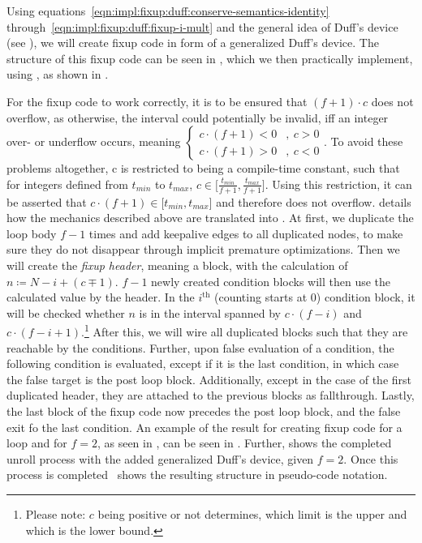 Using equations~\ref{eqn:impl:fixup:duff:conserve-semantics-identity} through~\ref{eqn:impl:fixup:duff:fixup-i-mult} and the general idea of Duff's device (see ), we will create fixup code in form of a generalized Duff's device.
The structure of this fixup code can be seen in , which we then practically implement, using , as shown in .





For the fixup code to work correctly, it is to be ensured that $(f + 1) \cdot c$ does not overflow, as otherwise, the interval \cinterval could potentially be invalid, iff an integer over- or underflow occurs, meaning $
\begin{cases}
    c \cdot (f + 1) < 0 &, \medspace c > 0\\
    c \cdot (f + 1) > 0 &, \medspace c < 0
\end{cases}$.
To avoid these problems altogether, c is restricted to being a compile-time constant, such that for integers defined from $t_{min}$ to $t_{max}$, $c \in \lbrack \frac{t_{min}}{f + 1}, \frac{t_{max}}{f + 1} \rbrack$.
Using this restriction, it can be asserted that $c \cdot (f + 1) \in \lbrack t_{min}, t_{max} \rbrack$ and therefore does not overflow.
 details how the mechanics described above are translated into \libFIRM.
At first, we duplicate the loop body $f - 1$ times and add keepalive edges to all duplicated nodes, to make sure they do not disappear through implicit premature optimizations.
Then we will create the \textit{fixup header}, meaning a block, with the calculation of $n \coloneqq N - i + (c \mp 1)$.
$f - 1$ newly created condition blocks will then use the calculated value by the header.
In the $i^{\text{th}}$ (counting starts at 0) condition block, it will be checked whether $n$ is in the interval spanned by $c \cdot (f - i)$ and  $c \cdot (f - i + 1)$.\footnote{Please note: $c$ being positive or not determines, which limit is the upper and which is the lower bound.}
After this, we will wire all duplicated blocks such that they are reachable by the conditions.
Further, upon false evaluation of a condition, the following condition is evaluated, except if it is the last condition, in which case the false target is the post loop block.
Additionally, except in the case of the first duplicated header, they are attached to the previous blocks as fallthrough.
Lastly, the last block of the fixup code now precedes the post loop block, and the false exit fo the last condition.
An example of the result for creating fixup code for a loop and for $f = 2$, as seen in , can be seen in .
Further,  shows the completed unroll process with the added generalized Duff's device, given $f = 2$.
Once this process is completed~ shows the resulting structure in pseudo-code notation.

